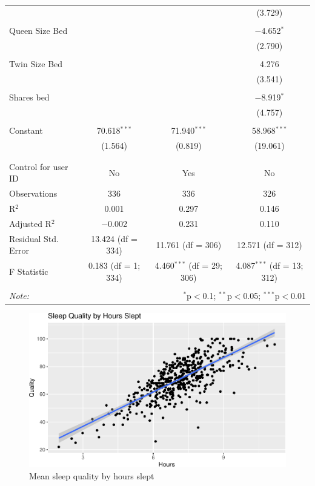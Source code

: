 \documentclass[12pt,]{article}
\begin{document}
\begin{table}[!htbp]
\begin{tabular}{@{\extracolsep{5pt}}lccc}
  &  &  & (3.729) \\ 
  & & & \\ 
 Queen Size Bed &  &  & $-$4.652$^{*}$ \\ 
  &  &  & (2.790) \\ 
  & & & \\ 
 Twin Size Bed &  &  & 4.276 \\ 
  &  &  & (3.541) \\ 
  & & & \\ 
 Shares bed &  &  & $-$8.919$^{*}$ \\ 
  &  &  & (4.757) \\ 
  & & & \\ 
 Constant & 70.618$^{***}$ & 71.940$^{***}$ & 58.968$^{***}$ \\ 
  & (1.564) & (0.819) & (19.061) \\ 
  & & & \\ 
\hline \\[-1.8ex] 
Control for user ID & No & Yes & No \\ 
Observations & 336 & 336 & 326 \\ 
R$^{2}$ & 0.001 & 0.297 & 0.146 \\ 
Adjusted R$^{2}$ & $-$0.002 & 0.231 & 0.110 \\ 
Residual Std. Error & 13.424 (df = 334) & 11.761 (df = 306) & 12.571 (df = 312) \\ 
F Statistic & 0.183 (df = 1; 334) & 4.460$^{***}$ (df = 29; 306) & 4.087$^{***}$ (df = 13; 312) \\ 
\hline 
\hline \\[-1.8ex] 
\textit{Note:}  & \multicolumn{3}{r}{$^{*}$p$<$0.1; $^{**}$p$<$0.05; $^{***}$p$<$0.01} \\ 
\end{tabular} 
\end{table}

\begin{figure}
\centering
\includegraphics{report_files/figure-latex/quality_by_hours_fig-1.pdf}
\caption{\label{fig:quality_by_hours_fig} Mean sleep quality by hours
slept}
\end{figure}
\end{document}
